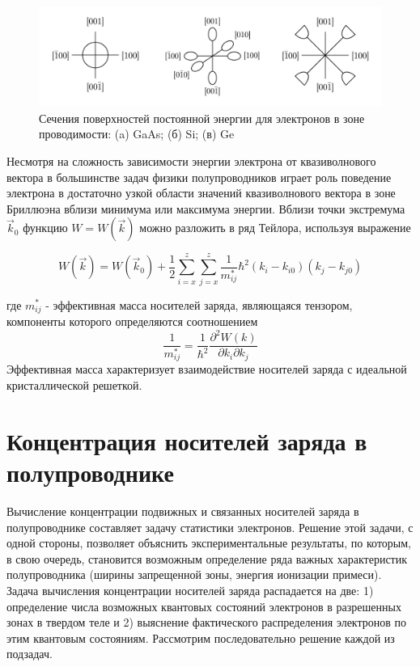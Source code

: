 		\begin{figure}[h!]
			\centering
			\includegraphics[width = .95\linewidth]{img/16}
			\caption{Сечения поверхностей постоянной энергии для электронов в зоне проводимости: (a) GaAs; (б) Si; (в) Ge}
			\label{fig:1.6}
		\end{figure}
		
		Несмотря на сложность зависимости энергии электрона от квазиволнового вектора в большинстве задач физики полупроводников
		играет роль поведение электрона в достаточно узкой области значений квазиволнового вектора в зоне Бриллюэна вблизи
		минимума или максимума энергии. Вблизи точки экстремума $\vec{k}_0$ функцию $W=W(\vec{k})$ можно разложить в ряд Тейлора, используя
		выражение
		
		\begin{equation}
		W(\vec{k})=W\left(\vec{k}_{0}\right)+\frac{1}{2} \sum_{i=x}^{z} \sum_{j=x}^{z} \frac{1}{m_{i j}^*} \hbar^{2}\left(k_{i}-k_{i 0}\right)\left(k_{j}-k_{j 0}\right)
		\label{eq:1.7}
		\end{equation}
		
		где $m_{i j}^*$ - эффективная масса носителей заряда, являющаяся тензором, компоненты которого определяются соотношением
		\begin{equation}
		\frac{1}{m^{*}_{i j}}=\frac{1}{\hbar^{2}} \frac{\partial^{2} W(k)}{\partial k_{i} \partial k_{j}}
		\label{eq:1.8}
		\end{equation}
		Эффективная масса характеризует взаимодействие носителей заряда с идеальной кристаллической решеткой.
		
		\section{Концентрация носителей заряда в полупроводнике}
		Вычисление концентрации подвижных и связанных носителей заряда в полупроводнике составляет задачу статистики электронов.
		Решение этой задачи, с одной стороны, позволяет объяснить экспериментальные результаты, по которым, в свою очередь,
		становится возможным определение ряда важных характеристик полупроводника (ширины запрещенной зоны, энергия ионизации примеси).
		Задача вычисления концентрации носителей заряда распадается на две:  1) определение числа возможных квантовых состояний
		электронов в разрешенных зонах в твердом теле и 2) выяснение фактического распределения электронов по этим квантовым
		состояниям. Рассмотрим последовательно решение каждой из подзадач.
		
